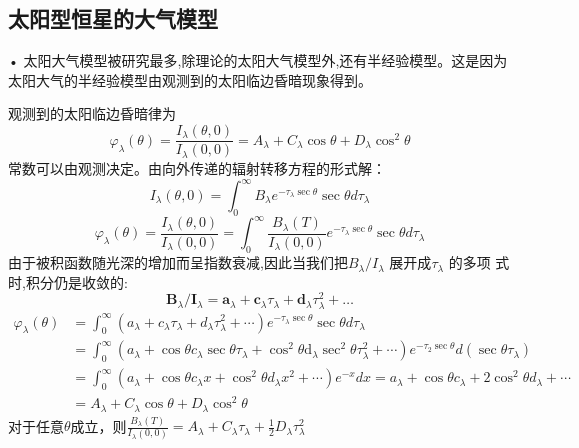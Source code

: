 \documentclass[UTF8]{article}
\begin{document}
\begin{fangsong}
\subsection{太阳型恒星的大气模型}
• 太阳大气模型被研究最多,除理论的太阳大气模型外,还有半经验模型。这是因为太阳大气的半经验模型由观测到的太阳临边昏暗现象得到。

观测到的太阳临边昏暗律为
$$\varphi _ { \lambda } ( \theta ) = \frac { I _ { \lambda } ( \theta , 0 ) } { I _ { \lambda } ( 0,0 ) } = A _ { \lambda } + C _ { \lambda } \cos \theta + D _ { \lambda } \cos ^ { 2 } \theta$$
常数可以由观测决定。由向外传递的辐射转移方程的形式解：
$$I _ { \lambda } ( \theta , 0 ) = \int _ { 0 } ^ { \infty } B _ { \lambda } e ^ { - \tau _ { \lambda } \sec \theta } \sec \theta d \tau _ { \lambda }$$
$$\varphi _ { \lambda } ( \theta ) = \frac { I _ { \lambda } ( \theta , 0 ) } { I _ { \lambda } ( 0,0 ) } = \int _ { 0 } ^ { \infty } \frac { B _ { \lambda } ( T ) } { I _ { \lambda } ( 0,0 ) } e ^ { - \tau _ { \lambda } \sec \theta } \sec \theta d \tau _ { \lambda }$$
由于被积函数随光深的增加而呈指数衰减,因此当我们把$B_λ /I_λ$ 展开成$\tau_λ$ 的多项
式时,积分仍是收敛的:
$$\mathbf { B } _ { \lambda } / \mathbf { I } _ { \lambda } = \mathbf { a } _ { \lambda } + \mathbf { c } _ { \lambda } \tau _ { \lambda } + \mathbf { d } _ { \lambda } \tau _ { \lambda } ^ { 2 } + \dots$$
\begin{align*}
	\varphi _ { \lambda } ( \theta ) &= \int _ { 0 } ^ { \infty } \left( a _ { \lambda } + c _ { \lambda } \tau _ { \lambda } + d _ { \lambda } \tau _ { \lambda } ^ { 2 } + \cdots \right) e ^ { - \tau _ { \lambda } \sec \theta } \sec \theta d \tau _ { \lambda }\\
	&= \int _ { 0 } ^ { \infty } \left( a _ { \lambda } + \cos \theta c _ { \lambda } \sec \theta \tau _ { \lambda } + \cos ^ { 2 } \theta \mathrm { d } _ { \lambda } \sec ^ { 2 } \theta \tau _ { \lambda } ^ { 2 } + \cdots \right) e ^ { - \tau _ { 2 } \sec \theta } d \left( \sec \theta \tau _ { \lambda } \right)\\
	&=\int _ { 0 } ^ { \infty } \left( a _ { \lambda } + \cos \theta c _ { \lambda } x + \cos ^ { 2 } \theta d _ { \lambda } x ^ { 2 } + \cdots \right) e ^ { - x } d x = a _ { \lambda } + \cos \theta c _ { \lambda } + 2 \cos ^ { 2 } \theta d _ { \lambda } + \cdots\\
	&=A _ { \lambda } + C _ { \lambda } \cos \theta + D _ { \lambda } \cos ^ { 2 } \theta
\end{align*}
对于任意$\theta$成立，则$\frac { B _ { \lambda } ( T ) } { I _ { \lambda } ( 0,0 ) } = A _ { \lambda } + C _ { \lambda } \tau _ { \lambda } + \frac { 1 } { 2 } D _ { \lambda } \tau _ { \lambda } ^ { 2 }$


\end{fangsong}
\end{document}
